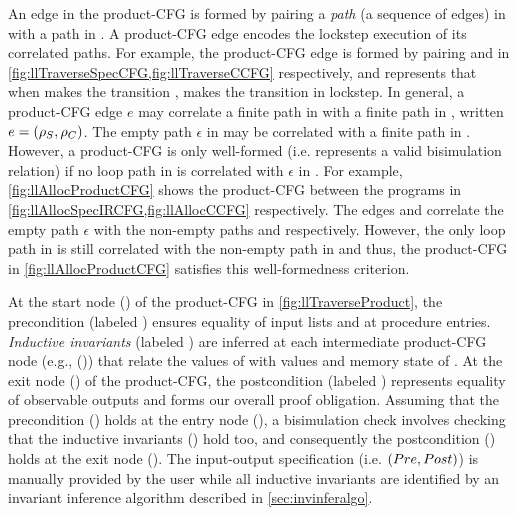 An edge in the product-CFG is formed by pairing a {\em path} (a sequence of edges) in \sprog{}
with a path in \cprog{}.
A product-CFG edge encodes the lockstep execution of its correlated paths.
For example, the product-CFG edge  is formed by pairing
 and  in \cref{fig:llTraverseSpecCFG,fig:llTraverseCCFG} respectively,
and represents that when \sprog{} makes the transition , \cprog{} makes the transition 
in lockstep.
In general, a product-CFG edge $e$ may correlate a finite path \sv{\rho} in \sprog{} with a finite path
\cv{\rho} in \cprog{}, written $e=({\tt \rho}_{S},{\tt \rho}_{C})$.
The empty path $\epsilon$ in \sprog{} may be correlated with a finite path in \cprog{}.
However, a product-CFG is only well-formed (i.e. represents a valid bisimulation relation)
if no loop path in \cprog{} is correlated with $\epsilon$ in \sprog{}.
For example, \cref{fig:llAllocProductCFG} shows the product-CFG between the programs
in \cref{fig:llAllocSpecIRCFG,fig:llAllocCCFG} respectively.
The edges  and  correlate the empty path $\epsilon$
with the non-empty paths  and  respectively.
However, the only loop path  in \cprog{} is still correlated with the non-empty path 
in \sprog{} and thus, the product-CFG in \cref{fig:llAllocProductCFG} satisfies this well-formedness criterion.

At the start node () of the product-CFG in \cref{fig:llTraverseProduct},
the precondition \pre{} (labeled )
ensures equality of input lists  and  at procedure entries.
{\em Inductive invariants} (labeled ) are inferred
at each intermediate product-CFG node (e.g., ()) that relate
the values of \sprog{} with values and memory state of \cprog{}.
At the exit node () of the product-CFG, the postcondition \post{} (labeled )
represents equality of observable outputs and forms our overall proof obligation.
Assuming that the precondition \pre{} () holds at the entry node (),
a bisimulation check involves checking that the inductive invariants () hold too,
and consequently the postcondition \post{} () holds at the exit node ().
The input-output specification (i.e. $({Pre}{},{Post}{})$) is manually provided by the user
while all inductive invariants are identified by an invariant inference algorithm described in \cref{sec:invinferalgo}.

